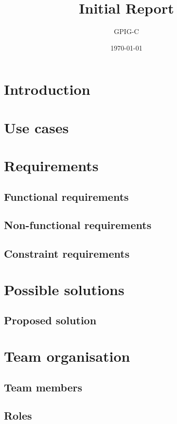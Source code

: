 \documentclass[10pt,a4paper]{article}
\begin{document}
\title{Initial Report}
\author{GPIG-C}
\date{\today}
\maketitle


\section{Introduction}


\section{Use cases}


\section{Requirements}

\subsection{Functional requirements}

\subsection{Non-functional requirements}

\subsection{Constraint requirements}


\section{Possible solutions}

\subsection{Proposed solution}


\section{Team organisation}

\subsection{Team members}

\subsection{Roles}
\end{document}
